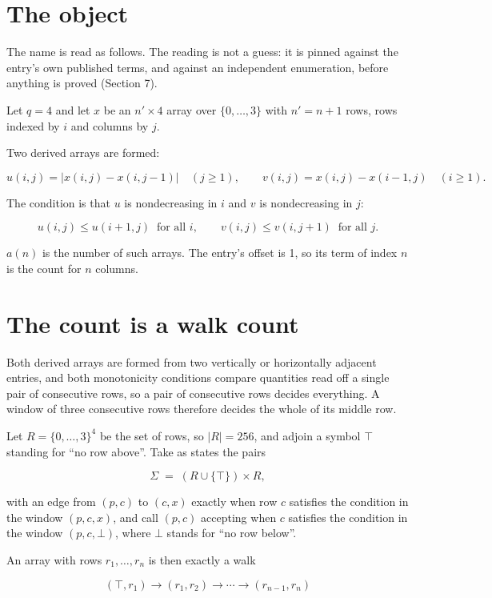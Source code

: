 \documentclass[11pt]{article}
\theoremstyle{definition}
\begin{document}
\section{The object}

The name is read as follows. The reading is not a guess: it is pinned against the entry's own published terms, and against an independent enumeration, before anything is proved (Section 7).

Let $q = 4$ and let $x$ be an $n' \times 4$ array over $\{0,\dots,3\}$ with $n' = n + 1$ rows, rows indexed by $i$ and columns by $j$.

Two derived arrays are formed:

\[u(i,j) = \lvert x(i,j) - x(i,j{-}1)\rvert\quad (j \ge 1), \qquad v(i,j) = x(i,j) - x(i{-}1,j)\quad (i \ge 1).\]

The condition is that $u$ is nondecreasing in $i$ and $v$ is nondecreasing in $j$:

\[u(i,j) \le u(i{+}1,j) \ \text{ for all } i, \qquad v(i,j) \le v(i,j{+}1) \ \text{ for all } j.\]

$a(n)$ is the number of such arrays. The entry's offset is 1, so its term of index $n$ is the count for $n$ columns.

\section{The count is a walk count}

Both derived arrays are formed from two vertically or horizontally adjacent entries, and both monotonicity conditions compare quantities read off a single pair of consecutive rows, so a pair of consecutive rows decides everything. A window of three consecutive rows therefore decides the whole of its middle row.

Let $R = \{0,\dots,3\}^{4}$ be the set of rows, so $|R| = 256$, and adjoin a symbol $\top$ standing for ``no row above''. Take as states the pairs

\[\Sigma \;=\; (R \cup \{\top\}) \times R,\]

with an edge from $(p,c)$ to $(c,x)$ exactly when row $c$ satisfies the condition in the window $(p,c,x)$, and call $(p,c)$ accepting when $c$ satisfies the condition in the window $(p,c,\bot)$, where $\bot$ stands for ``no row below''.

An array with rows $r_1,\dots,r_n$ is then exactly a walk

\[(\top,r_1) \to (r_1,r_2) \to \cdots \to (r_{n-1},r_n)\]
\end{document}
